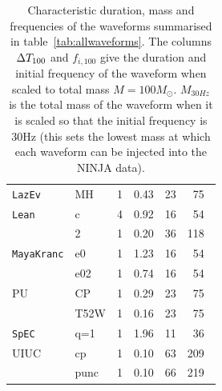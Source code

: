 \begin{table}
\begin{center}
\begin{tabular}{|l|l|c||c|c|c|}
{\tt LazEv} & MH   & 1 %
& 0.43 & 23 & 75  \\ %

{\tt Lean}  &  c   & 4 %
& 0.92 & 16 & 54  \\ %
            &  2   & 1 %
& 0.20 & 36 & 118\,\,\,  \\ %

{\tt MayaKranc}& e0& 1 %
& 1.23 & 16 & 54  \\ %
            & e02  & 1 %
& 0.74 & 16 & 54  \\ %

PU          & CP   & 1 %
& 0.29 & 23 & 75  \\ %
            & T52W & 1 %
& 0.16 & 23 & 75  \\ %

{\tt SpEC}  & q=1  & 1 %
& 1.96 & 11 & 36  \\ %

UIUC        & cp   & 1 %
& 0.10 & 63 & 209\,\,\,  \\ %
            & punc & 1 %
& 0.10 & 66 & 219\,\,\,  \\ %

 \hline
\end{tabular}
\end{center}
\caption[Characteristic duration, mass and frequencies of the NINJA-1
submissions]{
\label{tab:allwaveforms-SI}
Characteristic duration, mass and frequencies of
the waveforms summarised in table~\ref{tab:allwaveforms}.
The columns $\Delta T_{\rm 100}$ and $f_{i, 100}$ give the duration and initial
frequency of the waveform when scaled to total mass $M=100M_{\odot}$.
$M_{30Hz}$ is the total mass of the waveform when it is scaled so that
the initial frequency is 30Hz (this sets the lowest mass at which each waveform  can be injected into the NINJA data).}
\end{table}



